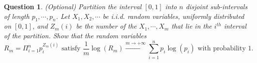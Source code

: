 \documentclass[11pt]{article}
\newtheorem{qu}{Question }
\begin{document}
\bigskip
\bigskip

\begin{qu}(Optional) \rm
Partition the interval $[0,1]$ into $n$ disjoint sub-intervals of length $p_1,\cdots, p_n$.  Let $X_1,X_2,\cdots$ be i.i.d. random variables, uniformly distributed on $[0,1]$, and $Z_m(i)$ be the number of the $X_1,\cdots,X_m$ 
that lie in the $i^{th}$ interval of the partition. Show that the random variables
$$R_m =\Pi_{i=1}^n  p_i^{Z_m (i)} \mbox{ satisfy } \frac{1}{m}\log( R_m) 
\stackrel{m\rightarrow+\infty}{\longrightarrow} \sum_{i=1}^n p_i\log(p_i) \mbox{  with probability } 1.
$$
\end{qu}
\end{document}
